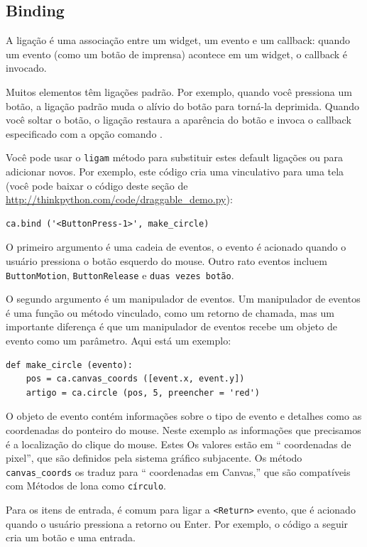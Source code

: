 \documentclass[10pt]{book}
\begin{document}
\begin{v erbatim}
\section{Binding}

A {\bf} ligação é uma associação entre um widget, um evento e um
callback: quando um evento (como um botão de imprensa) acontece em um widget, o
callback é invocado.

Muitos elementos têm ligações padrão. Por exemplo, quando você pressiona
um botão, a ligação padrão muda o alívio do botão
para torná-la deprimida. Quando você soltar o botão, o
ligação restaura a aparência do botão e invoca o
callback especificado com a opção {comando \tt}.

Você pode usar o {\tt ligam} método para substituir estes default
ligações ou para adicionar novos. Por exemplo, este código cria uma
vinculativo para uma tela (você pode baixar o código deste
seção de \url{http://thinkpython.com/code/draggable_demo.py}):

\begin{verbatim}
ca.bind ('<ButtonPress-1>', make_circle)
\end{verbatim}
%
O primeiro argumento é uma cadeia de eventos, o evento é acionado
quando o usuário pressiona o botão esquerdo do mouse. Outro rato
eventos incluem {\tt ButtonMotion}, {\tt ButtonRelease} e
{\tt duas vezes botão}.

O segundo argumento é um manipulador de eventos. Um manipulador de eventos
é uma função ou método vinculado, como um retorno de chamada, mas um importante
diferença é que um manipulador de eventos recebe um objeto de evento como um
parâmetro. Aqui está um exemplo:

\begin{verbatim}
def make_circle (evento):
    pos = ca.canvas_coords ([event.x, event.y])
    artigo = ca.circle (pos, 5, preencher = 'red')
\end{verbatim}
%
O objeto de evento contém informações sobre o tipo de evento e
detalhes como as coordenadas do ponteiro do mouse. Neste exemplo
as informações que precisamos é
a localização do clique do mouse. Estes
Os valores estão em `` coordenadas de pixel'', que são definidos pela
sistema gráfico subjacente. Os método \verb "canvas_coords"
os traduz para `` coordenadas em Canvas,'' que são compatíveis com
Métodos de lona como {\tt círculo}.

Para os itens de entrada, é comum para ligar a \verb "<Return>" evento,
que é acionado quando o usuário pressiona a {\sf retorno} ou
{\Sf Enter}. Por exemplo, o código a seguir cria um botão
e uma entrada.


\end{v erbatim}
\end{document}
